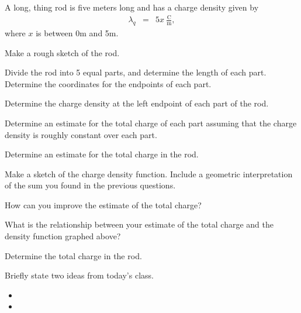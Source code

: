 \begin{problem}
\item A long, thing rod is five meters long and has a charge density given by
  \begin{eqnarray*}
    \lambda_q & = & 5x~\frac{\mathrm{C}}{\mathrm{m}},
  \end{eqnarray*}
  where $x$ is between 0m and 5m.
  \begin{subproblem}
  \item Make a rough sketch of the rod.
    \vspace{4em}
  \item Divide the rod into 5 equal parts, and determine the length of
    each part. Determine the coordinates for the endpoints of each part.
    \vfill
  \item Determine the charge density at the left endpoint of each part
    of the rod.
    \vfill
    \clearpage
  \item Determine an estimate for the total charge of each part
    assuming that the charge density is roughly constant over each
    part.
    \vfill
    \vfill
  \item Determine an estimate for the total charge in the rod.
    \vfill
    \vfill
    \clearpage
  \item Make a sketch of the charge density function.
    Include a geometric interpretation of the sum you found in the previous questions.
      \vfill
      \vfill
      \vfill
  \item How can you improve the estimate of the total charge?
    \vspace{2em}
  \item What is the relationship between your estimate of the total charge and the density function graphed above?
    \vfill
    \clearpage
  \item Determine the total charge in the rod.
    \vfill
  \end{subproblem}
\end{problem}

\postClass

\begin{problem}
\item Briefly state two ideas from today's class.
  \begin{itemize}
  \item
  \item
  \end{itemize}
\item
  \begin{subproblem}
    \item
  \end{subproblem}
\end{problem}




